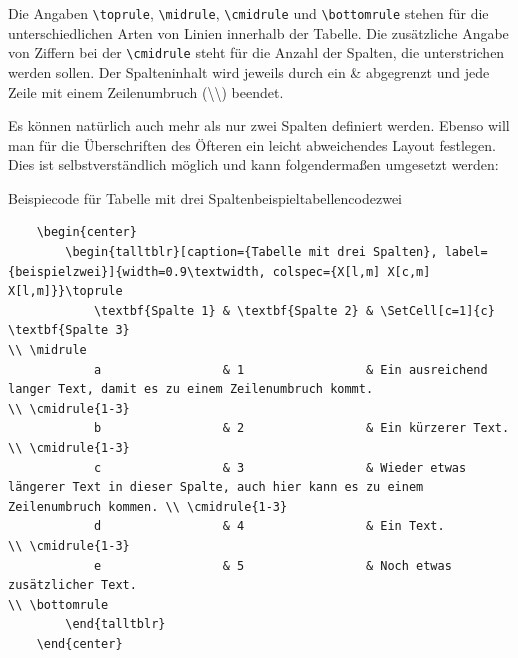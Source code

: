Die Angaben \texttt{\textbackslash toprule}, \texttt{\textbackslash midrule},
\texttt{\textbackslash cmidrule} und \texttt{\textbackslash bottomrule} stehen
für die unterschiedlichen Arten von Linien innerhalb der Tabelle. Die
zusätzliche Angabe von Ziffern bei der \texttt{\textbackslash cmidrule} steht
für die Anzahl der Spalten, die unterstrichen werden sollen. Der Spalteninhalt
wird jeweils durch ein \& abgegrenzt und jede Zeile mit einem Zeilenumbruch
(\textbackslash\textbackslash) beendet.

Es können natürlich auch mehr als nur zwei Spalten definiert werden. Ebenso will
man für die Überschriften des Öfteren ein leicht abweichendes Layout festlegen.
Dies ist selbstverständlich möglich und kann folgendermaßen umgesetzt werden:

\begin{code}{Beispiecode für Tabelle mit drei Spalten}{beispieltabellencodezwei}
	\begin{verbatim}
	\begin{center}
		\begin{talltblr}[caption={Tabelle mit drei Spalten}, label={beispielzwei}]{width=0.9\textwidth, colspec={X[l,m] X[c,m] X[l,m]}}\toprule
			\textbf{Spalte 1} & \textbf{Spalte 2} & \SetCell[c=1]{c} \textbf{Spalte 3}                                                            \\ \midrule
			a                 & 1                 & Ein ausreichend langer Text, damit es zu einem Zeilenumbruch kommt.                           \\ \cmidrule{1-3}
			b                 & 2                 & Ein kürzerer Text.                                                                            \\ \cmidrule{1-3}
			c                 & 3                 & Wieder etwas längerer Text in dieser Spalte, auch hier kann es zu einem Zeilenumbruch kommen. \\ \cmidrule{1-3}
			d                 & 4                 & Ein Text.                                                                                     \\ \cmidrule{1-3}
			e                 & 5                 & Noch etwas zusätzlicher Text.                                                                 \\ \bottomrule
		\end{talltblr}
	\end{center}	
	\end{verbatim}
\end{code}

